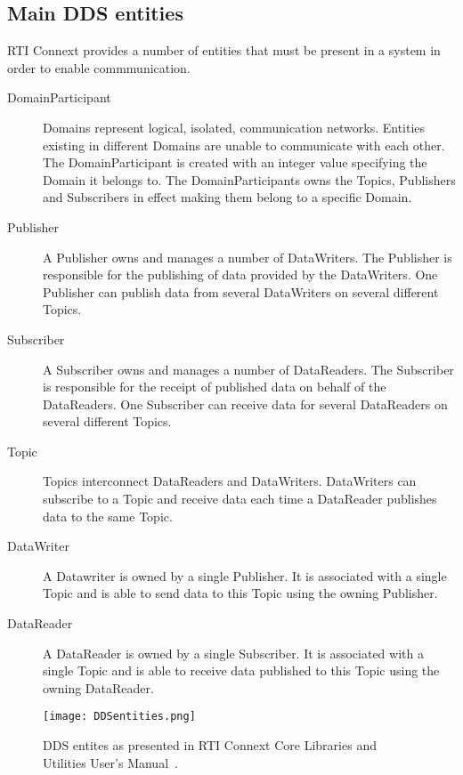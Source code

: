 \subsection{Main DDS entities}
RTI Connext provides a number of entities that must be present in a system in order to enable commmunication.

\begin{description}
	\item [DomainParticipant]
		Domains represent logical, isolated, communication networks. Entities existing in different Domains are unable to communicate with each other. The DomainParticipant is created with an integer value specifying the Domain it belongs to. The DomainParticipants owns the Topics, Publishers and Subscribers in effect making them belong to a specific Domain.
	
	\item [Publisher] A Publisher owns and manages a number of DataWriters. The Publisher is responsible for the publishing of data provided by the DataWriters. One Publisher can publish data from several DataWriters on several different Topics.
	
	\item [Subscriber] A Subscriber owns and manages a number of DataReaders. The Subscriber is responsible for the receipt of published data on behalf of the DataReaders. One Subscriber can receive data for several DataReaders on several different Topics. 
	
	\item [Topic] Topics interconnect DataReaders and DataWriters. DataWriters can subscribe to a Topic and receive data each time a DataReader publishes data to the same Topic.
	
	\item [DataWriter] A Datawriter is owned by a single Publisher. It is associated with a single Topic and is able to send data to this Topic using the owning Publisher.
	
	\item [DataReader] A DataReader is owned by a single Subscriber. It is associated with a single Topic and is able to receive data published to this Topic using the owning DataReader.
\end{description}

\begin{figure}
	\centering
	\texttt{[image: DDSentities.png]} 
	\caption[DDS entities]{
		\label{fig:ddsEntities} 
		\footnotesize{%
			DDS entites as presented in RTI Connext Core Libraries and Utilities User's Manual~\cite{rtiConnextUsersManual}.
		}
	}
\end{figure}

